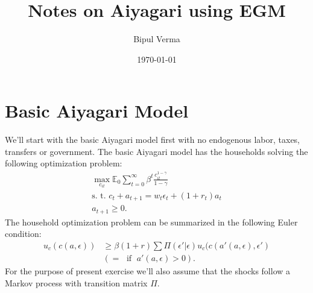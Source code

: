 \documentclass[12pt]{article}
\begin{document}

\title{Notes on Aiyagari using EGM}
\author{Bipul Verma}
\date{\today}
\maketitle


\vspace{8cm}



\newpage

\section{Basic Aiyagari Model}
We'll start with the basic Aiyagari model first with no endogenous labor, taxes, transfers or government. The basic Aiyagari model has the households solving the following optimization problem:
\begin{align*}
\max_{c_{it}} \mathbb{E}_0 \sum_{t=0}^{\infty} \beta^t \frac{c_{it}^{1-\gamma}}{1-\gamma} \\
\text{s. t.  } c_t + a_{t+1} = w_t\epsilon_t + (1+r_t)a_t \\
a_{t+1} \geq 0.
\end{align*}
The household optimization problem can be summarized in the following Euler condition:
\begin{align*}
u_c(c(a, \epsilon)) & \geq \beta (1+r) \sum \Pi(\epsilon'|\epsilon)u_c(c(a'(a, \epsilon), \epsilon') \\
 & (= \; \text{ if } \; a'(a, \epsilon) >0).
\end{align*}
For the purpose of present exercise we'll also assume that the shocks follow a Markov process with transition matrix $\Pi$.
\end{document}
